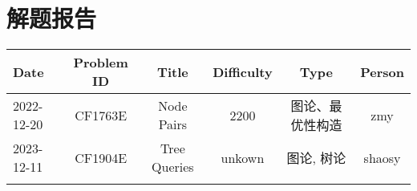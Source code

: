 \chapter{解题报告}
\begin{center}
\begin{longtable}{l c c c c c }

Date & Problem ID & Title & Difficulty & Type & Person   \\ 
\hline
2022-12-20 & CF1763E & Node Pairs & 2200 & 图论、最优性构造 & zmy  \\
\hline
2023-12-11 & CF1904E & Tree Queries & unkown & 图论, 树论 & shaosy \\


\hline

\label{tab:practice_index}
\end{longtable}
\end{center}
